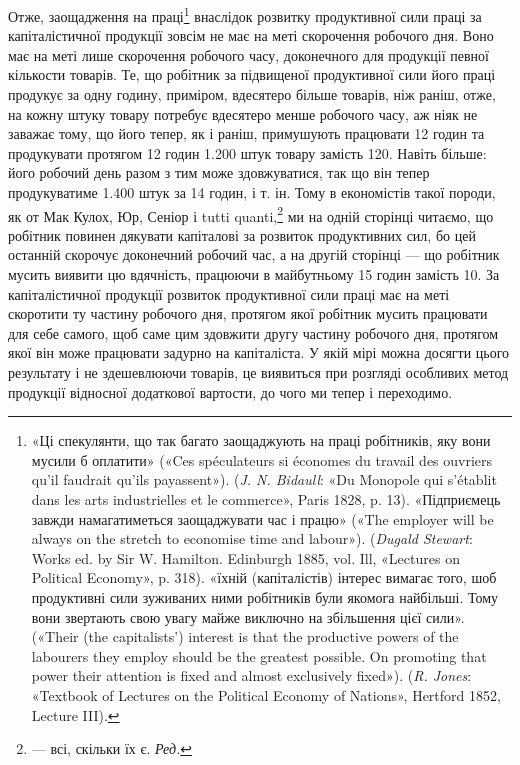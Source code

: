 Отже, заощадження на праці\footnote{
«Ці спекулянти, що так багато заощаджують на праці робітників,
яку вони мусили б оплатити» («Ces spéculateurs si économes du travail
des ouvriers qu’il faudrait qu’ils payassent»). (\emph{J. N. Bidaull}: «Du
Monopole qui s’établit dans les arts industrielles et le commerce», Paris
1828, p. 13). «Підприємець завжди намагатиметься заощаджувати час і
працю» («The employer will be always on the stretch to economise
time and labour»). (\emph{Dugald Stewart}: Works ed. by Sir W. Hamilton.
Edinburgh 1885, vol. Ill, «Lectures on Political Economy», p. 318). «їхній
(капіталістів) інтерес вимагає того, шоб продуктивні сили зуживаних
ними робітників були якомога найбільші. Тому вони звертають свою
увагу майже виключно на збільшення цієї сили». («Their (the capitalists’)
interest is that the productive powers of the labourers they employ should
be the greatest possible. On promoting that power their attention is fixed
and almost exclusively fixed»). (\emph{R. Jones}: «Textbook of Lectures on
the Political Economy of Nations», Hertford 1852, Lecture III).
} внаслідок розвитку продуктивної сили праці за капіталістичної продукції
зовсім не має на меті скорочення робочого дня. Воно має на меті лише скорочення
робочого часу, доконечного для продукції певної кількости товарів.
Те, що робітник за підвищеної продуктивної сили його праці
продукує за одну годину, приміром, вдесятеро більше товарів,
ніж раніш, отже, на кожну штуку товару потребує вдесятеро
менше робочого часу, аж ніяк не заважає тому, що його тепер,
як і раніш, примушують працювати 12 годин та продукувати
протягом 12 годин \num{1.200} штук товару замість 120. Навіть більше:
його робочий день разом з тим може здовжуватися, так що він
тепер продукуватиме \num{1.400} штук за 14 годин, і т. ін. Тому в економістів
такої породи, як от Мак Кулох, Юр, Сеніор і tutti
quanti,\footnote*{
— всі, скільки їх є. \emph{Ред.}
} ми на одній сторінці читаємо, що робітник повинен дякувати капіталові за
розвиток продуктивних сил, бо цей останній
скорочує доконечний робочий час, а на другій сторінці — що
робітник мусить виявити цю вдячність, працюючи в майбутньому
15 годин замість 10. За капіталістичної продукції розвиток продуктивної сили
праці має на меті скоротити ту частину робочого
дня, протягом якої робітник мусить працювати для себе самого,
щоб саме цим здовжити другу частину робочого дня, протягом
якої він може працювати задурно на капіталіста. У якій мірі
можна досягти цього результату і не здешевлюючи товарів, це
виявиться при розгляді особливих метод продукції відносної
додаткової вартости, до чого ми тепер і переходимо.
